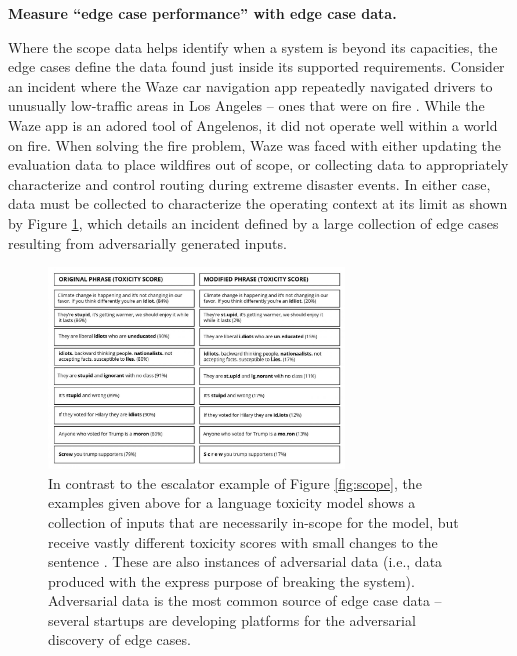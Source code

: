 %
%

\textbf{Measure ``edge case performance'' with edge case data.}


Where the scope data helps identify when a system is beyond its capacities, the edge cases define the data found just inside its supported requirements. Consider an incident where the Waze car navigation app repeatedly navigated drivers to unusually low-traffic areas in Los Angeles -- ones that were on fire \cite{olsson_incident_2017}. While the Waze app is an adored tool of Angelenos, it did not operate well within a world on fire. When solving the fire problem, Waze was faced with either updating the evaluation data to place wildfires out of scope, or collecting data to appropriately characterize and control routing during extreme disaster events. In either case, data must be collected to characterize the operating context at its limit as shown by Figure \ref{fig:toxicity}, which details an incident defined by a large collection of edge cases resulting from adversarially generated inputs.

\begin{figure}[ht]
    \centering
    \includegraphics[width=0.7\textwidth]{images/incidents/toxicity.jpeg}
    \caption{In contrast to the escalator example of Figure \ref{fig:scope}, the examples given above for a language toxicity model shows a collection of inputs that are necessarily in-scope for the model, but receive vastly different toxicity scores with small changes to the sentence \cite{olsson_incident_2017, hosseini_deceiving_2017}. These are also instances of adversarial data (i.e., data produced with the express purpose of breaking the system). Adversarial data is the most common source of edge case data -- several startups are developing platforms for the adversarial discovery of edge cases.}
    \label{fig:toxicity}
\end{figure}

